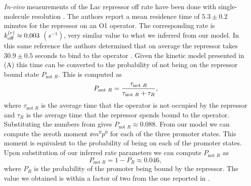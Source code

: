 {\it In-vivo} measurements of the Lac repressor off rate have been done with
single-molecule resolution \cite{Hammar2014}. The authors report a mean
residence time of $5.3 \pm 0.2$ minutes for the repressor on an O1 operator. The
corresponding rate is $k^{(r)}_{\text{off}} \approx 0.003$ $(s^{-1})$, very similar value to
what we inferred from our model. In this same reference the authors determined
that on average the repressor takes $30.9 \pm 0.5$ seconds to bind to the
operator \cite{Hammar2014}. Given the kinetic model presented in
(A) this time can be converted to the probability of
not being on the repressor bound state $P_{\text{not }R}$. This is computed as
\begin{equation}
  P_{\text{not }R} = {\tau_{\text{not }R} \over
                      \tau_{\text{not }R} + \tau_{R}},
\end{equation}
where $\tau_{\text{not }R}$ is the average time that the operator is not
occupied by the repressor and $\tau_{R}$ is the average time that the repressor
spends bound to the operator. Substituting the numbers from \cite{Hammar2014}
gives $P_{\text{not }R} \approx 0.088$. From our model we can compute the zeroth
moment $\ee{m^0 p^0}$ for each of the three promoter states. This moment is
equivalent to the probability of being on each of the promoter states. Upon
substitution of our inferred rate parameters we can compute $P_{\text{not }R}$
as
\begin{equation}
  P_{\text{not }R} = 1 - P_R \approx 0.046,
\end{equation}
where $P_R$ is the probability of the promoter being bound by the repressor. The
value we obtained is within a factor of two from the one reported in
\cite{Hammar2014}.
